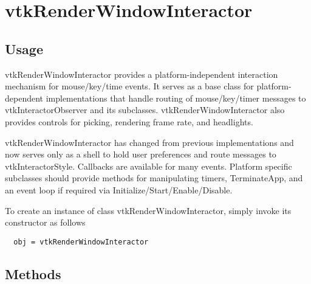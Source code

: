 \section{vtkRenderWindowInteractor}

\subsection{Usage}

 vtkRenderWindowInteractor provides a platform-independent interaction
 mechanism for mouse/key/time events. It serves as a base class for
 platform-dependent implementations that handle routing of mouse/key/timer
 messages to vtkInteractorObserver and its subclasses. vtkRenderWindowInteractor 
 also provides controls for picking, rendering frame rate, and headlights.

 vtkRenderWindowInteractor has changed from previous implementations and
 now serves only as a shell to hold user preferences and route messages to
 vtkInteractorStyle. Callbacks are available for many events.  Platform
 specific subclasses should provide methods for manipulating timers,
 TerminateApp, and an event loop if required via
 Initialize/Start/Enable/Disable.

To create an instance of class vtkRenderWindowInteractor, simply
invoke its constructor as follows
\begin{verbatim}
  obj = vtkRenderWindowInteractor
\end{verbatim}
\subsection{Methods}

